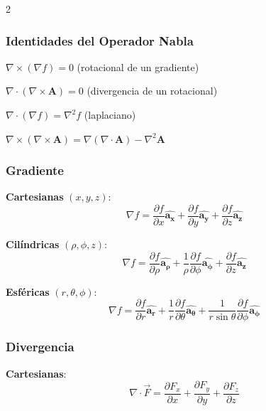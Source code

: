 \begin{multicols}{2}
  \subsubsection*{Identidades del Operador Nabla}
\begin{itemform}
  \item $\nabla \times (\nabla f) = 0$ \quad (rotacional de un gradiente)
  \item $\nabla \cdot (\nabla \times \mathbf{A}) = 0$ \quad (divergencia de un rotacional)
  \item $\nabla \cdot (\nabla f) = \nabla^2 f$ \quad (laplaciano)
  \item $\nabla \times (\nabla \times \mathbf{A}) = \nabla(\nabla \cdot \mathbf{A}) - \nabla^2 \mathbf{A}$
  \end{itemform}
\subsubsection*{Gradiente}
\begin{itemform}
  
    \item \textbf{Cartesianas } $(x,y,z)$:
    $$\nabla f = \frac{\partial f}{\partial x}\mathbf{\hat{a_x}} + \frac{\partial f}{\partial y}\mathbf{\hat{a_y}} + \frac{\partial f}{\partial z}\mathbf{\hat{a_z}}$$
    
    \item \textbf{Cilíndricas } $(\rho,\phi,z)$:
    $$\nabla f = \frac{\partial f}{\partial \rho}\mathbf{\hat{a_\rho}} + \frac{1}{\rho}\frac{\partial f}{\partial \phi}\mathbf{\hat{a_\phi}} + \frac{\partial f}{\partial z}\mathbf{\hat{a_z}}$$
    
    \item \textbf{Esféricas } $(r,\theta,\phi)$:
    $$\nabla f = \frac{\partial f}{\partial r}\mathbf{\hat{a_r}} + \frac{1}{r}\frac{\partial f}{\partial \theta}\mathbf{\hat{a_\theta}} + \frac{1}{r\sin\theta}\frac{\partial f}{\partial \phi}\mathbf{\hat{a_\phi}}$$
\end{itemform}
\subsubsection*{Divergencia}
\begin{itemform}
    \item \textbf{Cartesianas}:
    $$\nabla \cdot \vec{F} = \frac{\partial F_x}{\partial x} + \frac{\partial F_y}{\partial y} + \frac{\partial F_z}{\partial z}$$
    

\end{itemform}
\end{multicols}
